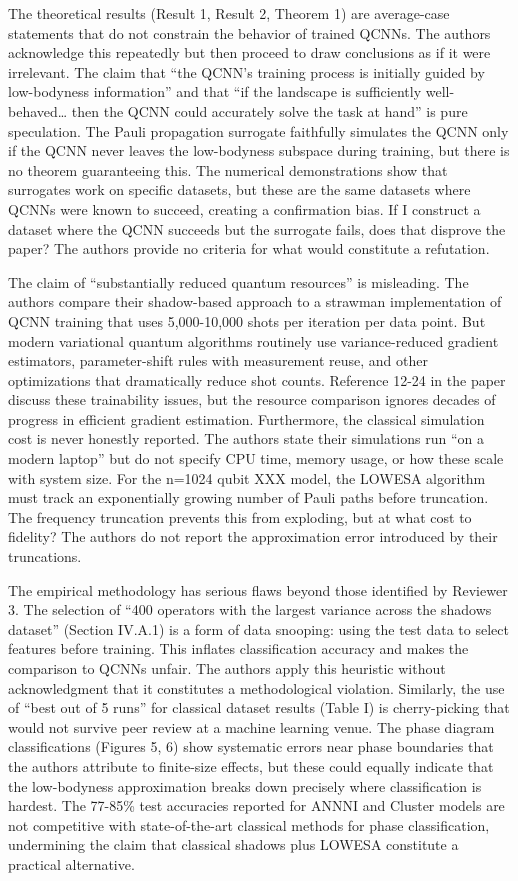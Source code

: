 \documentclass[10pt,letterpaper]{article}
\begin{document}
The theoretical results (Result 1, Result 2, Theorem 1) are average-case statements that do not constrain the behavior of trained QCNNs. The authors acknowledge this repeatedly but then proceed to draw conclusions as if it were irrelevant. The claim that ``the QCNN's training process is initially guided by low-bodyness information'' and that ``if the landscape is sufficiently well-behaved\ldots{} then the QCNN could accurately solve the task at hand'' is pure speculation. The Pauli propagation surrogate faithfully simulates the QCNN only if the QCNN never leaves the low-bodyness subspace during training, but there is no theorem guaranteeing this. The numerical demonstrations show that surrogates work on specific datasets, but these are the same datasets where QCNNs were known to succeed, creating a confirmation bias. If I construct a dataset where the QCNN succeeds but the surrogate fails, does that disprove the paper? The authors provide no criteria for what would constitute a refutation.

The claim of ``substantially reduced quantum resources'' is misleading. The authors compare their shadow-based approach to a strawman implementation of QCNN training that uses 5,000-10,000 shots per iteration per data point. But modern variational quantum algorithms routinely use variance-reduced gradient estimators, parameter-shift rules with measurement reuse, and other optimizations that dramatically reduce shot counts. Reference 12-24 in the paper discuss these trainability issues, but the resource comparison ignores decades of progress in efficient gradient estimation. Furthermore, the classical simulation cost is never honestly reported. The authors state their simulations run ``on a modern laptop'' but do not specify CPU time, memory usage, or how these scale with system size. For the n=1024 qubit XXX model, the LOWESA algorithm must track an exponentially growing number of Pauli paths before truncation. The frequency truncation prevents this from exploding, but at what cost to fidelity? The authors do not report the approximation error introduced by their truncations.

The empirical methodology has serious flaws beyond those identified by Reviewer 3. The selection of ``400 operators with the largest variance across the shadows dataset'' (Section IV.A.1) is a form of data snooping: using the test data to select features before training. This inflates classification accuracy and makes the comparison to QCNNs unfair. The authors apply this heuristic without acknowledgment that it constitutes a methodological violation. Similarly, the use of ``best out of 5 runs'' for classical dataset results (Table I) is cherry-picking that would not survive peer review at a machine learning venue. The phase diagram classifications (Figures 5, 6) show systematic errors near phase boundaries that the authors attribute to finite-size effects, but these could equally indicate that the low-bodyness approximation breaks down precisely where classification is hardest. The 77-85\% test accuracies reported for ANNNI and Cluster models are not competitive with state-of-the-art classical methods for phase classification, undermining the claim that classical shadows plus LOWESA constitute a practical alternative.
\end{document}
